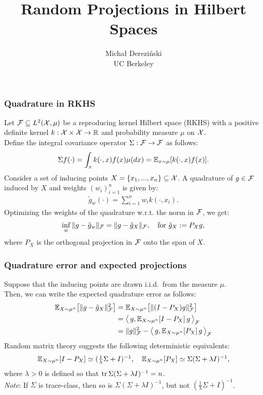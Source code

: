 \documentclass[10pt]{beamer}
\title[]{Random Projections in Hilbert Spaces}
\author[]{Micha{\l} Derezi\'{n}ski\\
UC Berkeley}
\begin{document}
\begin{frame}
  \titlepage
\end{frame}

\linespread{1.3}

\begin{frame}
  \frametitle{Quadrature in RKHS}

  Let $\mathcal{F}\subseteq L^2(\mathcal{X},\mu)$ be a reproducing kernel Hilbert space (RKHS) with a
  positive definite kernel $k:\mathcal{X}\times\mathcal{X}\rightarrow \mathbb R$
  and probability measure $\mu$ on $\mathcal{X}$. \\
  Define the integral covariance operator $\Sigma:\mathcal{F}\rightarrow \mathcal{F}$
as follows:
  \begin{align*}
        \Sigma f(\cdot) = \int_xk(\cdot,x)f(x)\mu(dx) = \mathbb E_{x\sim\mu}[k(\cdot,x)f(x)].
  \end{align*}  
  Consider a set of inducing points $X=\{x_1,...,x_n\}\subseteq \mathcal{X}$.
A quadrature of $g\in \mathcal{F}$ induced by $X$ and
weights $(w_i)_{i=1}^n$  is given by:
  \begin{align*}
    \tilde g_w(\cdot) = \sum_{i=1}^nw_ik(\cdot,x_i).
  \end{align*}
Optimizing the weights of the quadrature w.r.t. the norm in $\mathcal{F}$, we
get:
\begin{align*}
  \inf_w \|g - \tilde g_w\|_{\mathcal{F}} = \|g - \hat g_X\|_{\mathcal{F}},\quad
 \text{for } \hat g_X := P_Xg,
\end{align*}
where $P_X$ is the orthogonal projection in $\mathcal{F}$ onto the span of $X$.
\end{frame}

\begin{frame}
  \frametitle{Quadrature error and expected projections}
  Suppose that the inducing points are drawn i.i.d.\ from the measure
  $\mu$.\\
  Then, we can write the expected quadrature error as follows:
  \begin{align*}
    \mathbb E_{X\sim\mu^n}\big[\|g-\hat g_X\|_{\mathcal{F}}^2\big]
    &=\mathbb E_{X\sim\mu^n}\big[\|(I-P_X)g\|_{\mathcal{F}}^2\big]
    \\
    &= \big\langle\,
      g,\mathbb E_{X\sim\mu^n}[I-P_X]\,g\,\big\rangle_{\mathcal{F}}
    \\
    &=\|g\|_{\mathcal{F}}^2 -  \big\langle\,
      g,\mathbb E_{X\sim\mu^n}[P_X]\,g\,\big\rangle_{\mathcal{F}}
  \end{align*}
Random matrix theory suggests the following deterministic equivalents:
  \begin{align*}
    \mathbb E_{X\sim\mu^n}[I-P_X] \simeq (\tfrac1\lambda\Sigma+I)^{-1},\quad
    \mathbb E_{X\sim\mu^n}[P_X]\simeq \Sigma(\Sigma + \lambda I)^{-1},
  \end{align*}
  where $\lambda>0$ is defined so that $\mathrm{tr}\,\Sigma(\Sigma+\lambda
  I)^{-1}=n$.\\[5mm]

 \emph{Note}: If $\Sigma$ is trace-class, then so is
 $\Sigma(\Sigma+\lambda I)^{-1}$,  but not $(\frac1\lambda\Sigma+I)^{-1}$.
\end{frame}
\end{document}
